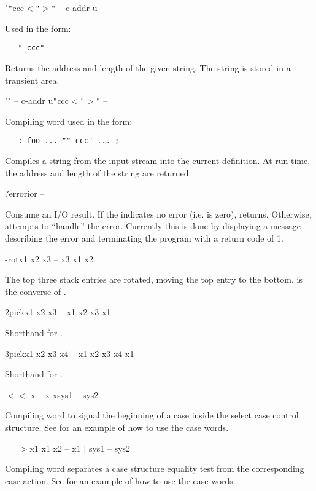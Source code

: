 \begin{gloss}{"}{\verb|"|ccc$<$\verb|"|$>$\verb|"| -- c-addr u}

Used in the form:
\begin{verbatim}
   " ccc"
\end{verbatim}
Returns the address and length of the given string.  The string is stored
in a transient area.
\end{gloss}
\begin{cgloss}{""}{ -- c-addr u}{\verb|"|ccc$<$\verb|"|$>$\verb|"| -- }

Compiling word used in the form:
\begin{verbatim}
   : foo ... "" ccc" ... ;
\end{verbatim}
Compiles a string from the input stream into the current definition.
At run time, the address and length of the string are returned.
\end{cgloss}
\begin{gloss}{?error}{ior -- }

Consume an I/O result.  If the  indicates no error (i.e.
 is zero),  returns.  Otherwise, 
attempts to ``handle'' the error.  Currently this is done by
displaying a message describing the error and
terminating the program with a return code of 1.
\end{gloss}
\begin{gloss}{-rot}{x1 x2 x3 -- x3 x1 x2}

The top three stack entries are rotated, moving the top entry to the
bottom.   is the converse of .
\end{gloss}
\begin{gloss}{2pick}{x1 x2 x3 -- x1 x2 x3 x1}

Shorthand for .
\end{gloss}
\begin{gloss}{3pick}{x1 x2 x3 x4 -- x1 x2 x3 x4 x1}

Shorthand for .
\end{gloss}
\begin{cgloss}{$<<$}{ x -- x x}{sys1 -- sys2}

Compiling word to signal the beginning of a case inside the select case
control structure.  See  for an example of how to use the case words.
\end{cgloss}
\begin{cgloss}{==$>$}{x1 x1 x2 -- x1 $|$ }{sys1 -- sys2}

Compiling word separates a case structure equality test from the corresponding
case action.  See  for an example of how to use the case words.
\end{cgloss}
